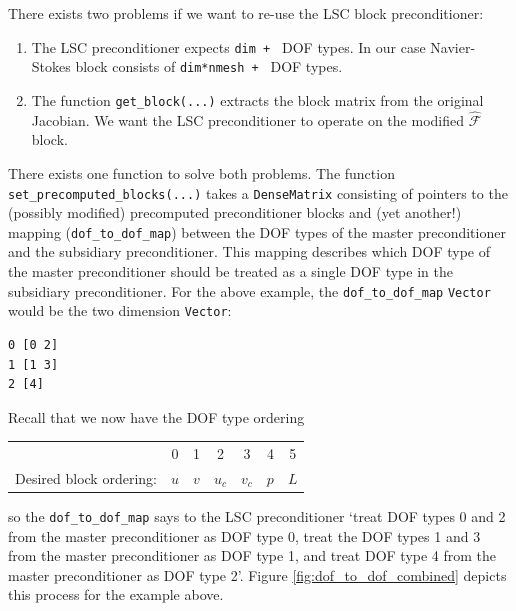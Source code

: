 There exists two problems if we want to re-use the LSC block preconditioner:
\begin{enumerate}
\item The LSC preconditioner expects \texttt{dim \allowbreak + }
  DOF types. In our case Navier-Stokes block consists of \texttt{dim*nmesh
    \allowbreak + } DOF types.
\item The function \texttt{get\_\allowbreak block(...)} extracts the block
  matrix from the original Jacobian. We want the LSC preconditioner to operate
  on the modified $\hat{\mathcal{F}}$ block.
\end{enumerate}
There exists one function to solve both problems. The function
\texttt{set\_\allowbreak precomputed\_\allowbreak blocks(...)} takes a
\texttt{Dense\allowbreak Matrix} consisting of pointers to the (possibly
modified) precomputed preconditioner blocks and (yet another!) mapping
(\texttt{dof\_\allowbreak to\_\allowbreak dof\_\allowbreak map}) between the
DOF types of the master preconditioner and the subsidiary preconditioner. This
mapping describes which DOF type of the master preconditioner should be treated
as a single DOF type in the subsidiary preconditioner.  For the above example,
the \texttt{dof\_\allowbreak to\_\allowbreak dof\_\allowbreak map}
\texttt{Vector} would be the two dimension \texttt{Vector}:
\begin{verbatim}
0 [0 2]
1 [1 3]
2 [4]
\end{verbatim}
Recall that we now have the DOF type ordering
\begin{center}
    \begin{tabular}{ | r | c c c c c c |}
    \hline
                        & 0   &  1  &  2  &   3    &   4   &  5  \\ 
Desired block ordering: & $u$ & $v$ & $u_c$ & $v_c$& $p$   & $L$ \\ 
    \hline
    \end{tabular}
\end{center}
so the \texttt{dof\_\allowbreak to\_\allowbreak dof\_\allowbreak map} says to
the LSC preconditioner `treat DOF types 0 and 2 from the master preconditioner
as DOF type 0, treat the DOF types 1 and 3 from the master preconditioner as
DOF type 1, and treat DOF type 4 from the master preconditioner as DOF type 2'.
Figure \ref{fig:dof_to_dof_combined} depicts this process for the example above.

